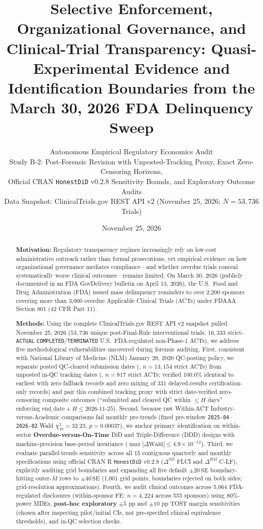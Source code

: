 \documentclass[11pt,letterpaper]{article}
\title{\textbf{Selective Enforcement, Organizational Governance, and Clinical-Trial Transparency: Quasi-Experimental Evidence and Identification Boundaries from the March 30, 2026 FDA Delinquency Sweep}}
\author{Autonomous Empirical Regulatory Economics Audit\\
\small Study B-2: Post-Forensic Revision with Unposted-Tracking Proxy, Exact Zero-Censoring Horizons,\\
\small Official CRAN \texttt{HonestDiD} v0.2.8 Sensitivity Bounds, and Exploratory Outcome Audits\\
\small Data Snapshot: ClinicalTrials.gov REST API v2 (November 25, 2026; $N=53,736$ Trials)}
\date{November 25, 2026}
\begin{document}
\maketitle

\begin{abstract}
\noindent\textbf{Motivation:} Regulatory transparency regimes increasingly rely on low-cost administrative outreach rather than formal prosecutions, yet empirical evidence on how organizational governance mediates compliance---and whether overdue trials conceal systematically worse clinical outcomes---remains limited. On March 30, 2026 (publicly documented in an FDA GovDelivery bulletin on April 13, 2026), the U.S.\ Food and Drug Administration (FDA) issued mass delinquency reminders to over 2,200 sponsors covering more than 3,000 overdue Applicable Clinical Trials (ACTs) under FDAAA Section 801 (42 CFR Part 11).

\noindent\textbf{Methods:} Using the complete ClinicalTrials.gov REST API v2 snapshot pulled November 25, 2026 ($53,736$ unique post-Final-Rule interventional trials; $16,333$ strict-\texttt{ACTUAL} \texttt{COMPLETED}/\texttt{TERMINATED} U.S.\ FDA-regulated non-Phase-1 ACTs), we address five methodological vulnerabilities uncovered during forensic auditing. First, consistent with National Library of Medicine (NLM) January 29, 2020 QC-posting policy, we separate posted QC-cleared submission dates (, $n=13,154$ strict ACTs) from unposted in-QC tracking dates (, $n=817$ strict ACTs; verified 100.0\% identical to earliest  with zero fallback records and zero mixing of 331 delayed-results certification-only records) and pair this combined tracking proxy with strict date-verified zero-censoring composite outcomes (``submitted and cleared QC within $\le H$ days'' enforcing $\text{end\_date}+H\le\text{2026-11-25}$). Second, because raw Within-ACT Industry-versus-Academic comparisons fail monthly pre-trends (fixed pre-window \texttt{2025-04}--\texttt{2026-02} Wald $\chi^2_{10}=32.23$, $p=0.00037$), we anchor primary identification on within-sector \textbf{Overdue-versus-On-Time} DiD and Triple-Difference (DDD) designs with machine-precision base-period invariance ($\max|\Delta\text{Wald}|\le 4.9\times 10^{-12}$). Third, we evaluate parallel-trends sensitivity across all 15 contiguous quarterly and monthly specifications using official CRAN R \texttt{HonestDiD} v0.2.8 ($\Delta^{SD}$ FLCI and $\Delta^{RM}$ C-LF), explicitly auditing grid boundaries and expanding all five default $\pm 20\,\mathrm{SE}$ boundary-hitting outer-$\bar{M}$ rows to $\pm 40\,\mathrm{SE}$ (1,001 grid points, boundaries rejected on both sides; grid-resolution approximations). Fourth, we audit clinical outcomes across 5,064 FDA-regulated disclosures (within-sponsor FE: $n=4,224$ across 555 sponsors) using 80\%-power MDEs, \textbf{post-hoc exploratory} $\pm 5$ pp and $\pm 10$ pp TOST margin sensitivities (chosen after inspecting pilot/initial CIs, not pre-specified clinical equivalence thresholds), and in-QC selection checks.


\end{abstract}
\end{document}
